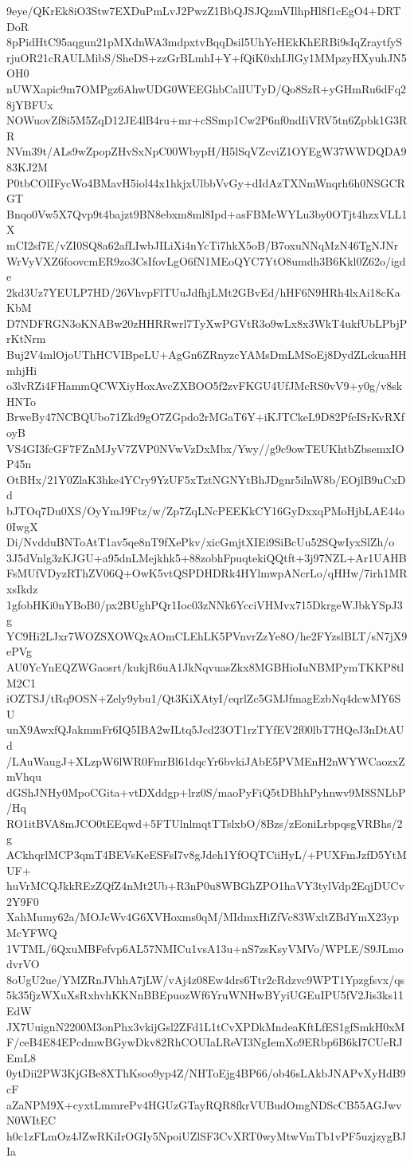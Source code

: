 9eye/QKrEk8iO3Stw7EXDuPmLvJ2PwzZ1BbQJSJQzmVIlhpHl8f1cEgO4+DRTDoR
8pPidHtC95aqgun21pMXdnWA3mdpxtvBqqDsil5UhYeHEkKhERBi9sIqZraytfyS
rjuOR21cRAULMibS/SheDS+zzGrBLmhI+Y+fQiK0xhIJlGy1MMpzyHXyuhJN5OH0
nUWXapic9m7OMPgz6AhwUDG0WEEGhbCalIUTyD/Qo8SzR+yGHmRu6dFq28jYBFUx
NOWuovZf8i5M5ZqD12JE4lB4ru+mr+cSSmp1Cw2P6nf0ndIiVRV5tn6Zpbk1G3RR
NVm39t/ALs9wZpopZHvSxNpC00WbypH/H5lSqVZcviZ1OYEgW37WWDQDA983KJ2M
P0tbCOlIFycWo4BMavH5iol44x1hkjxUlbbVvGy+dIdAzTXNmWnqrh6h0NSGCRGT
Bnqo0Vw5X7Qvp9t4bajzt9BN8ebxm8ml8Ipd+asFBMeWYLu3by0OTjt4hzxVLL1X
mCI2sf7E/vZI0SQ8a62afLIwbJILiXi4nYcTi7hkX5oB/B7oxuNNqMzN46TgNJNr
WrVyVXZ6foovcmER9zo3CsIfovLgO6fN1MEoQYC7YtO8umdh3B6Kkl0Z62o/igde
2kd3Uz7YEULP7HD/26VhvpFlTUuJdfhjLMt2GBvEd/hHF6N9HRh4lxAi18cKaKbM
D7NDFRGN3oKNABw20zHHRRwrl7TyXwPGVtR3o9wLx8x3WkT4ukfUbLPbjPrKtNrm
Buj2V4mlOjoUThHCVIBpeLU+AgGn6ZRnyzcYAMsDmLMSoEj8DydZLckuaHHmhjHi
o3lvRZi4FHammQCWXiyHoxAvcZXBOO5f2zvFKGU4UfJMcRS0vV9+y0g/v8skHNTo
BrweBy47NCBQUbo71Zkd9gO7ZGpdo2rMGaT6Y+iKJTCkeL9D82PfcISrKvRXfoyB
VS4GI3fcGF7FZnMJyV7ZVP0NVwVzDxMbx/Ywy//g9c9owTEUKhtbZbsemxIOP45n
OtBHx/21Y0ZlaK3hke4YCry9YzUF5xTztNGNYtBhJDgnr5ilnW8b/EOjlB9uCxDd
bJTOq7Du0XS/OyYmJ9Ftz/w/Zp7ZqLNcPEEKkCY16GyDxxqPMoHjbLAE44o0IwgX
Di/NvdduBNToAtT1av5qe8nT9fXePkv/xicGmjtXIEi9SiBcUu52SQwIyxSlZh/o
3J5dVnlg3zKJGU+a95dnLMejkhk5+88zobhFpuqtekiQQtft+3j97NZL+Ar1UAHB
FsMUfVDyzRThZV06Q+OwK5vtQSPDHDRk4HYlmwpANcrLo/qHHw/7irh1MRxsIkdz
1gfobHKi0nYBoB0/px2BUghPQr1Ioc03zNNk6YcciVHMvx715DkrgeWJbkYSpJ3g
YC9Hi2LJxr7WOZSXOWQxAOmCLEhLK5PVnvrZzYe8O/he2FYzslBLT/sN7jX9ePVg
AU0YcYnEQZWGaosrt/kukjR6uA1JkNqvuasZkx8MGBHioIuNBMPymTKKP8tlM2C1
iOZTSJ/tRq9OSN+Zely9ybu1/Qt3KiXAtyI/eqrlZc5GMJfmagEzbNq4dcwMY6SU
unX9AwxfQJakmmFr6IQ5IBA2wILtq5Jcd23OT1rzTYfEV2f00lbT7HQeJ3nDtAUd
/LAuWaugJ+XLzpW6lWR0FmrBl61dqcYr6bvkiJAbE5PVMEnH2nWYWCaozxZmVhqu
dGShJNHy0MpoCGita+vtDXddgp+lrz0S/maoPyFiQ5tDBhhPyhnwv9M8SNLbP/Hq
RO1itBVA8mJCO0tEEqwd+5FTUlnlmqtTTslxbO/8Bzs/zEoniLrbpqsgVRBhs/2g
ACkhqrlMCP3qmT4BEVsKeESFsI7v8gJdeh1YfOQTCiiHyL/+PUXFmJzfD5YtMUF+
huVrMCQJkkREzZQfZ4nMt2Ub+R3nP0u8WBGhZPO1haVY3tylVdp2EqjDUCv2Y9F0
XahMumy62a/MOJcWv4G6XVHoxms0qM/MIdmxHiZfVc83WxltZBdYmX23ypMcYFWQ
1VTML/6QxuMBFefvp6AL57NMICu1vsA13u+nS7zsKsyVMVo/WPLE/S9JLmodvrVO
8oUgU2ue/YMZRnJVhhA7jLW/vAj4z08Ew4drs6Ttr2cRdzvc9WPT1Ypzgfsvx/qs
5k35fjzWXuXsRxhvhKKNnBBEpuozWf6YruWNHwBYyiUGEuIPU5fV2Jis3ks11EdW
JX7UuignN2200M3onPhx3vkijGsl2ZFd1L1tCvXPDkMndeaKftLfES1gfSmkH0xM
F/ceB4E84EPcdmwBGywDkv82RhCOUIaLReVI3NgIemXo9ERbp6B6kI7CUeRJEmL8
0ytDii2PW3KjGBe8XThKsoo9yp4Z/NHToEjg4BP66/ob46sLAkbJNAPvXyHdB9cF
aZaNPM9X+cyxtLmmrePv4HGUzGTayRQR8fkrVUBudOmgNDScCB55AGJwvN0WItEC
h0c1zFLmOz4JZwRKiIrOGIy5NpoiUZlSF3CvXRT0wyMtwVmTb1vPF5uzjzygBJIa
